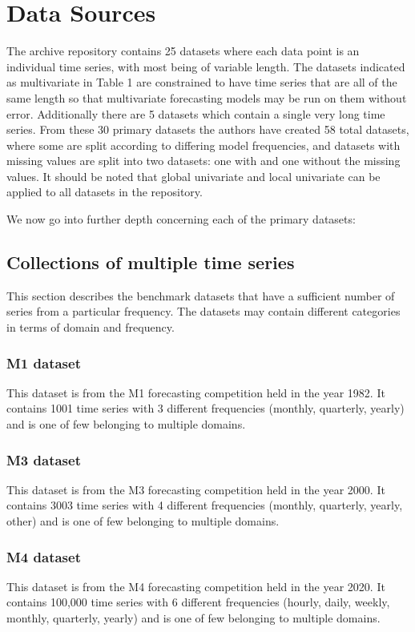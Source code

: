 \section{Data Sources}
The archive repository contains 25 datasets where each data point is an individual time series, with most being of variable length. The datasets indicated as multivariate in Table 1 are constrained to have time series that are all of the same length so that multivariate forecasting models may be run on them without error. Additionally there are 5 datasets which contain a single very long time series. From these 30 primary datasets the authors have created 58 total datasets, where some are split according to differing model frequencies, and  datasets with missing values are split into two datasets: one with and one without the missing values. It should be noted that global univariate and local univariate can be applied to all datasets in the repository.

We now go into further depth concerning each of the primary datasets:

\subsection{Collections of multiple time series}
This section describes the benchmark datasets that have a sufficient number of series from a particular
frequency. The datasets may contain different categories in terms of domain and frequency.

\subsubsection{M1 dataset}
This dataset is from the M1 forecasting competition held in the year 1982. It contains 1001 time series with 3 different frequencies (monthly, quarterly, yearly) and is one of few belonging to multiple domains.

\subsubsection{M3 dataset}
This dataset is from the M3 forecasting competition held in the year 2000. It contains 3003 time series with 4 different frequencies (monthly, quarterly, yearly, other) and is one of few belonging to multiple domains.

\subsubsection{M4 dataset}
This dataset is from the M4 forecasting competition held in the year 2020. It contains 100,000 time series with 6 different frequencies (hourly, daily, weekly, monthly, quarterly, yearly) and is one of few belonging to multiple domains.

